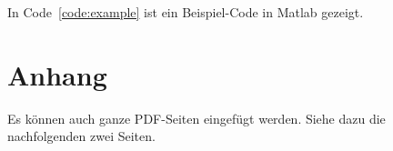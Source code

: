 \documentclass[11pt,a4paper,hidelinks]{article}
\begin{document}
In Code~\ref{code:example} ist ein Beispiel-Code in Matlab gezeigt.



\section{Anhang}\label{sec:anhang}

Es können auch ganze PDF-Seiten eingefügt werden. Siehe dazu die nachfolgenden zwei Seiten.






\end{document}
